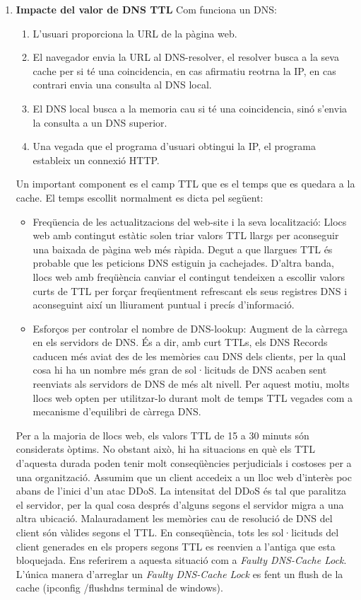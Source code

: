 \documentclass[a4paper, 10pt]{article}
\begin{document}
\begin{enumerate}
\item \textbf{Impacte del valor de DNS TTL}
Com funciona un DNS:
\begin{enumerate}
    \item L'usuari proporciona la URL de la pàgina web.
    \item El navegador envia la URL al DNS-resolver, el resolver busca a la seva cache per si té una coincidencia, en cas afirmatiu reotrna la IP, en cas contrari envia una consulta al DNS local.
    \item El DNS local busca a la memoria cau si té una coincidencia, sinó s'envia la consulta a un DNS superior.
    \item Una vegada que el programa d’usuari obtingui la IP, el programa estableix un connexió HTTP.
\end{enumerate}
Un important component es el camp TTL que es el temps que es quedara a la cache. El temps escollit normalment es dicta pel següent:
\begin{itemize}
    \item Freqüencia de les actualitzacions del web-site i la seva localització: Llocs web amb contingut estàtic solen triar valors TTL llargs per aconseguir una baixada de pàgina web més ràpida. Degut a que llargues TTL és probable que les peticions DNS estiguin ja cachejades. D'altra banda, llocs web amb freqüència
    canviar el contingut tendeixen a escollir valors curts de TTL per forçar freqüentment refrescant els seus registres DNS i aconseguint així un lliurament puntual i precís d’informació.
    \item Esforços per controlar el nombre de DNS-lookup: Augment de la càrrega en els servidors de DNS. És a dir, amb curt
    TTLs, els DNS Records caducen més aviat des de les memòries cau DNS dels clients, per la qual cosa hi ha un nombre més gran de sol·licituds de DNS acaben sent reenviats als servidors de DNS de més alt nivell. Per aquest motiu, molts llocs web opten per utilitzar-lo durant molt de temps TTL vegades com a mecanisme d’equilibri de càrrega DNS.
\end{itemize}
Per a la majoria de llocs web, els valors TTL de 15 a 30 minuts són
considerats òptims. No obstant això, hi ha situacions en què els TTL d’aquesta durada poden tenir molt conseqüències perjudicials i costoses per a una organització. Assumim que un client accedeix a un lloc web d’interès poc abans de l’inici d’un atac DDoS. La intensitat del
DDoS és tal que paralitza el servidor, per la qual cosa després d’alguns segons el servidor migra a una altra ubicació. Malauradament les memòries cau de resolució de DNS del client són vàlides segons el TTL. En conseqüència, tots les sol·licituds del client generades en els propers segons TTL es reenvien a l'antiga que esta bloquejada. Ens referirem a aquesta situació com a \textit{Faulty DNS-Cache Lock}. L'única manera d'arreglar un \textit{Faulty DNS-Cache Lock} es fent un flush de la cache (ipconfig /flushdns  terminal de windows).


\end{enumerate}
\end{document}
